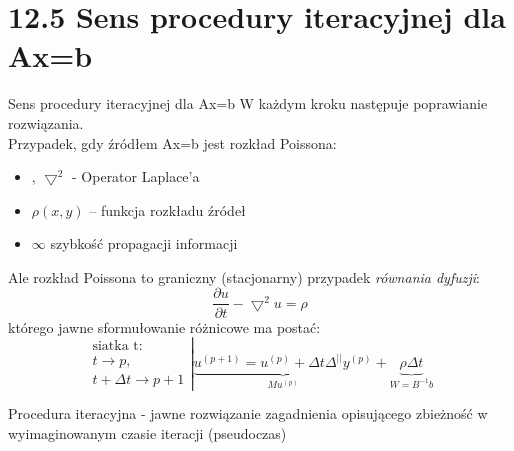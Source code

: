 \section{12.5 Sens procedury iteracyjnej dla Ax=b}

\begin{frame}{Sens procedury iteracyjnej dla Ax=b}
  W każdym kroku następuje poprawianie rozwiązania.\\
  Przypadek, gdy źródłem Ax=b jest rozkład Poissona:
  \begin{itemize}
    \item {}, $\bigtriangledown^2$ - Operator Laplace’a
    \item $\rho(x,y)$ -- funkcja rozkładu źródeł
    \item $\infty$ szybkość propagacji informacji
  \end{itemize}
\end{frame}

\begin{frame}{}
  Ale rozkład Poissona to graniczny (stacjonarny) przypadek \emph{równania dyfuzji}:
  $$\boxed{\frac{\partial u}{\partial t} - \bigtriangledown^2u=\rho}$$
  którego jawne sformułowanie różnicowe ma postać:
  $$
  \left.
  \begin{array}{lr}
    \text{siatka t}:\\
    t\rightarrow p,\\
    t+\Delta t\rightarrow p+1
  \end{array}\right|
  \underbrace{u^{(p+1)}=u^{(p)}+\Delta t\Delta^{||}y^{(p)}}_{Mu^{(p)}}+\underbrace{\rho\Delta t}_{W=B^{-1}b}
  $$
  

  Procedura iteracyjna - jawne rozwiązanie zagadnienia opisującego zbieżność w wyimaginowanym czasie iteracji (pseudoczas)
\end{frame}

